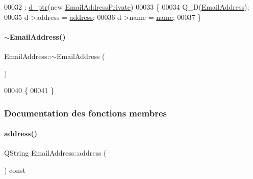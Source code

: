 \begin{DoxyCode}
00032                                                                       : \hyperlink{class_simple_mail_1_1_email_address_a27188c75c77a942e79cac0420788f214}{d\_ptr}(\textcolor{keyword}{new} 
      \hyperlink{class_simple_mail_1_1_email_address_private}{EmailAddressPrivate})
00033 \{
00034     Q\_D(\hyperlink{class_simple_mail_1_1_email_address}{EmailAddress});
00035     d->address = \hyperlink{class_simple_mail_1_1_email_address_a426faf41f9f1c56014a97eec4d37ba4a}{address};
00036     d->name = \hyperlink{class_simple_mail_1_1_email_address_a311fdcf9bc548a3db4a985b396ab5355}{name};
00037 \}
\end{DoxyCode}
\mbox{\label{class_simple_mail_1_1_email_address_a360542a2ad94a7f484f85557f0b53321}} 
\paragraph{\texorpdfstring{$\sim$\+Email\+Address()}{~EmailAddress()}}
{\footnotesize\ttfamily Email\+Address\+::$\sim$\+Email\+Address (\begin{DoxyParamCaption}{ }\end{DoxyParamCaption})\hspace{0.3cm}{\ttfamily [virtual]}}


\begin{DoxyCode}
00040 \{
00041 \}
\end{DoxyCode}


\subsubsection{Documentation des fonctions membres}
\mbox{\label{class_simple_mail_1_1_email_address_a426faf41f9f1c56014a97eec4d37ba4a}} 
\paragraph{\texorpdfstring{address()}{address()}}
{\footnotesize\ttfamily Q\+String Email\+Address\+::address (\begin{DoxyParamCaption}{ }\end{DoxyParamCaption}) const}



